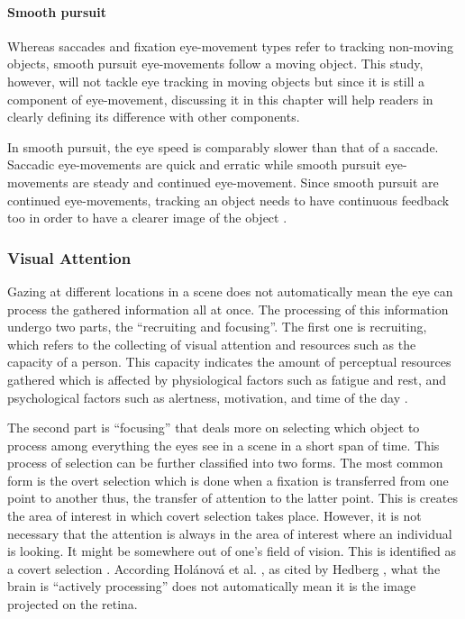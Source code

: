 \documentclass[journal]{./IEEE/IEEEtran}
\begin{document}
\paragraph{Smooth pursuit} \leavevmode


Whereas saccades and fixation eye-movement types refer to tracking non-moving objects, smooth pursuit eye-movements follow  a moving object. This study, however, will not tackle eye tracking in moving objects but since it is still a component of eye-movement, discussing it in this chapter will help readers in clearly defining its difference with other components. 

In smooth pursuit, the eye speed is comparably slower than that of a saccade. Saccadic eye-movements are quick and erratic while smooth pursuit  eye-movements are steady and continued eye-movement. Since smooth pursuit are continued eye-movements, tracking an object needs to have continuous feedback too in order to have a clearer image of the object  \cite{chen_choi_2013}. 



\subsubsection{Visual Attention} \leavevmode

Gazing at different locations in a scene does not automatically mean the eye can process the gathered information all at once. The processing of this information undergo two parts, the “recruiting and focusing”. The first one is recruiting, which refers to the collecting of visual attention and resources such as the capacity of a person. This capacity indicates the amount of perceptual resources gathered which is affected by physiological factors such as fatigue and rest, and psychological factors such as alertness, motivation, and time of the day\cite {osman_dupire_mader_cubaud_natkin_2016} . 

The second part is “focusing” that deals more on selecting which object to process among everything the eyes see in a scene in a short span of time. This process of selection can be further classified into two forms. The most common form is the overt selection which is done when a fixation is transferred from one point to another thus, the transfer of attention to the latter point. This is creates the area of interest in which covert selection takes place. However, it is not necessary that the attention is always in the area of interest where an individual is looking. It might be somewhere out of one’s field of vision. This is identified as a covert selection  \cite {hedberg00} \cite{chen_choi_2013} . According Holánová et al.  \cite{holánová_hedberg_nilsson_1999}, as cited by Hedberg  \cite {hedberg00}, what the brain is “actively processing” does not automatically mean it is the image projected on the retina. 
\end{document}
